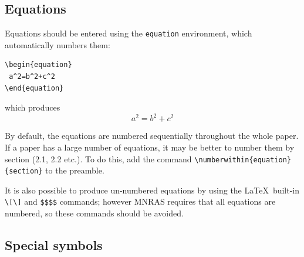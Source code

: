 \documentclass[a4paper,fleqn,usenatbib,useAMS]{mnras}
\begin{document}
\subsection{Equations}
Equations should be entered using the \verb'equation' environment, which automatically numbers them:

\begin{verbatim}
\begin{equation}
 a^2=b^2+c^2
\end{equation}
\end{verbatim}
\noindent which produces
\begin{equation}
 a^2=b^2+c^2
\end{equation}

By default, the equations are numbered sequentially throughout the whole paper. If a paper has a large number of equations, it may be better to number them by section (2.1, 2.2 etc.). To do this, add the command \verb'\numberwithin{equation}{section}' to the preamble.

It is also possible to produce un-numbered equations by using the \LaTeX\ built-in \verb'\['\textellipsis\verb'\]' and \verb'$$'\textellipsis\verb'$$' commands; however MNRAS requires that all equations are numbered, so these commands should be avoided.

\subsection{Special symbols}
\end{document}
